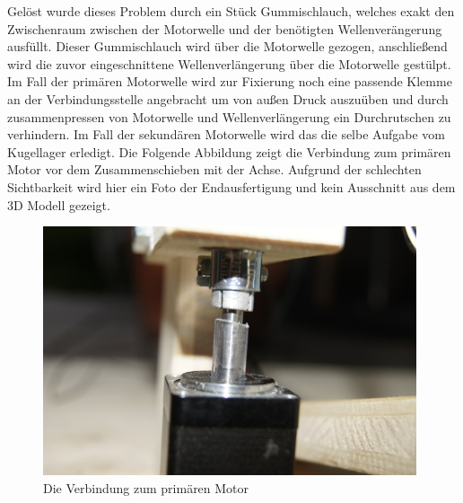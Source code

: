 \begin{itemize}
Gelöst wurde dieses Problem durch ein Stück Gummischlauch, welches exakt den Zwischenraum zwischen der Motorwelle und der benötigten Wellenverängerung ausfüllt. Dieser Gummischlauch wird über die Motorwelle gezogen, anschließend wird die zuvor eingeschnittene Wellenverlängerung über die Motorwelle gestülpt. Im Fall der primären Motorwelle wird zur Fixierung noch eine passende Klemme an der Verbindungsstelle angebracht um von außen Druck auszuüben und durch zusammenpressen von Motorwelle und Wellenverlängerung ein Durchrutschen zu verhindern. Im Fall der sekundären Motorwelle wird das die selbe Aufgabe vom Kugellager erledigt. Die Folgende Abbildung zeigt die Verbindung zum primären Motor vor dem Zusammenschieben mit der Achse. 
\newpage
Aufgrund der schlechten Sichtbarkeit wird hier ein Foto der Endausfertigung und kein Ausschnitt aus dem 3D Modell gezeigt.
\begin{figure}[H]
\centering
\includegraphics[width=11cm]{images/motor}
\caption{Die Verbindung zum primären Motor}
\end{figure}
\end{itemize}